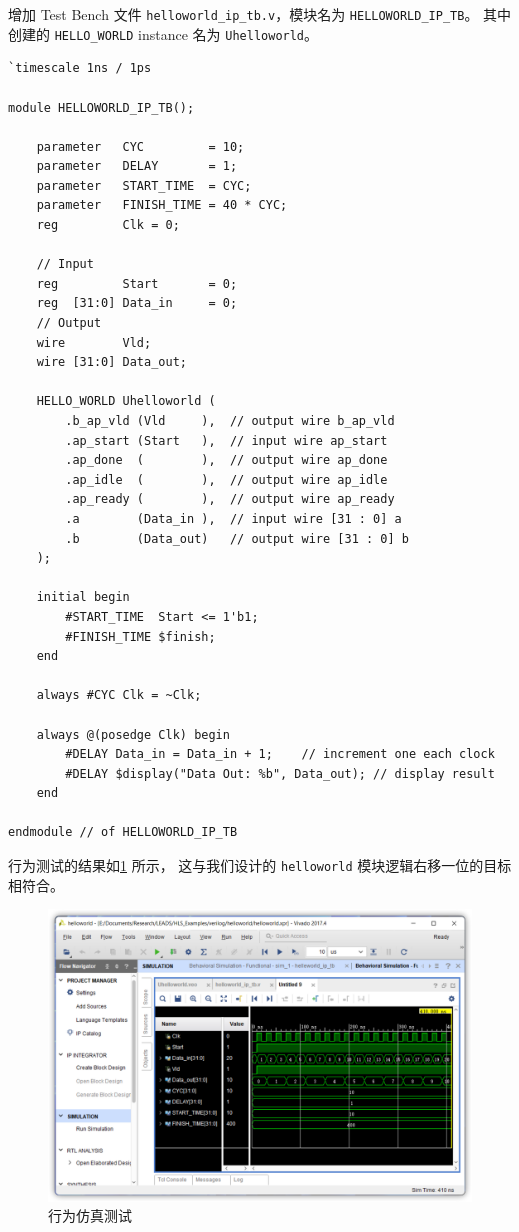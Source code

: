 \documentclass[Chinese,TC,use boldface,simple name]{beaulivre}
\begin{document}
      增加 Test Bench 文件 \texttt{helloworld\_ip\_tb.v}，模块名为 \texttt{HELLOWORLD\_IP\_TB}。
      其中创建的 \texttt{HELLO\_WORLD} instance 名为 \texttt{Uhelloworld}。
      \begin{lstlisting}[style={v}, title={helloworld\_ip\_tb.v}]
`timescale 1ns / 1ps

module HELLOWORLD_IP_TB();

    parameter   CYC         = 10;
    parameter   DELAY       = 1;
    parameter   START_TIME  = CYC;
    parameter   FINISH_TIME = 40 * CYC;
    reg         Clk = 0;

    // Input
    reg         Start       = 0;
    reg  [31:0] Data_in     = 0;
    // Output
    wire        Vld;
    wire [31:0] Data_out;
        
    HELLO_WORLD Uhelloworld (
        .b_ap_vld (Vld     ),  // output wire b_ap_vld
        .ap_start (Start   ),  // input wire ap_start
        .ap_done  (        ),  // output wire ap_done
        .ap_idle  (        ),  // output wire ap_idle
        .ap_ready (        ),  // output wire ap_ready
        .a        (Data_in ),  // input wire [31 : 0] a
        .b        (Data_out)   // output wire [31 : 0] b
    );

    initial begin
        #START_TIME  Start <= 1'b1;
        #FINISH_TIME $finish;
    end
    
    always #CYC Clk = ~Clk;
    
    always @(posedge Clk) begin
        #DELAY Data_in = Data_in + 1;    // increment one each clock
        #DELAY $display("Data Out: %b", Data_out); // display result
    end
    
endmodule // of HELLOWORLD_IP_TB
      \end{lstlisting}

      行为测试的结果如\cref{fig:behavioral_sim} 所示，
      这与我们设计的 \texttt{helloworld} 模块逻辑右移一位的目标相符合。
      \begin{figure}[htbp]
        \centering
        \includegraphics[width=.8\linewidth]{win/helloworld/behavioral_sim.png}
        \caption{行为仿真测试}
        \label{fig:behavioral_sim}
      \end{figure}
\end{document}
